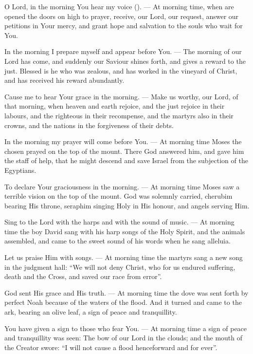 \documentclass[12pt,twoside,a5paper]{article}
\begin{document}
\begin{halfparskip}
  O Lord, in the morning You hear my voice (). --- At morning time, when are opened the doors on high to prayer, receive, our Lord, our request, answer our petitions in Your mercy, and grant hope and salvation to the souls who wait for You.

  In the morning I prepare myself and appear before You. --- The morning of our Lord has come, and suddenly our Saviour shines forth, and gives a reward to the just. Blessed is he who was zealous, and has worked in the vineyard of Christ, and has received his reward abundantly.

  Cause me to hear Your grace in the morning. --- Make us worthy, our Lord, of that morning, when heaven and earth rejoice, and the just rejoice in their labours, and the righteous in their recompense, and the martyrs also in their crowns, and the nations in the forgiveness of their debts.

  In the morning my prayer will come before You. --- At morning time Moses the chosen prayed on the top of the mount. There God answered him, and gave him the staff of help, that he might descend and save Israel from the subjection of the Egyptians.

  To declare Your graciousness in the morning. --- At morning time Moses saw a terrible vision on the top of the mount. God was solemnly carried, cherubim bearing His throne, seraphim singing Holy in His honour, and angels serving Him.

  Sing to the Lord with the harps and with the sound of music. --- At morning time the boy David sang with his harp songs of the Holy Spirit, and the animals assembled, and came to the sweet sound of his words when he sang alleluia.

  Let us praise Him with songs. --- At morning time the martyrs sang a new song in the judgment hall: ``We will not deny Christ, who for us endured suffering, death and the Cross, and saved our race from error''.

  God sent His grace and His truth. --- At morning time the dove was sent forth by perfect Noah because of the waters of the flood. And it turned and came to the ark, bearing an olive leaf, a sign of peace and tranquillity.

  You have given a sign to those who fear You. --- At morning time a sign of peace and tranquillity was seen: The bow of our Lord in the clouds; and the mouth of the Creator swore: ``I will not cause a flood henceforward and for ever''.


\end{halfparskip}
\end{document}

